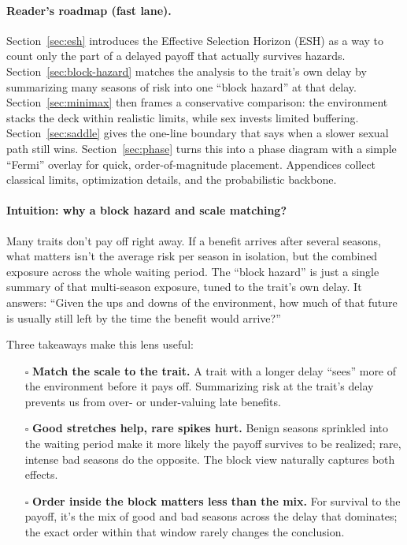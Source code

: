 \documentclass[11pt]{article}
\theoremstyle{upright}
\begin{document}
\paragraph{Reader’s roadmap (fast lane).}
Section~\ref{sec:esh} introduces the Effective Selection Horizon (ESH) as a way to count only the part of a delayed payoff that actually survives hazards. 
Section~\ref{sec:block-hazard} matches the analysis to the trait’s own delay by summarizing many seasons of risk into one “block hazard” at that delay. 
Section~\ref{sec:minimax} then frames a conservative comparison: the environment stacks the deck within realistic limits, while sex invests limited buffering. 
Section~\ref{sec:saddle} gives the one-line boundary that says when a slower sexual path still wins. 
Section~\ref{sec:phase} turns this into a phase diagram with a simple “Fermi” overlay for quick, order-of-magnitude placement. 
Appendices collect classical limits, optimization details, and the probabilistic backbone.

\paragraph{Intuition: why a block hazard and scale matching?}
Many traits don’t pay off right away. If a benefit arrives after several seasons, what matters isn’t the average risk per season in isolation, but the combined exposure across the whole waiting period. The “block hazard” is just a single summary of that multi-season exposure, tuned to the trait’s own delay. It answers: “Given the ups and downs of the environment, how much of that future is usually still left by the time the benefit would arrive?”

Three takeaways make this lens useful:
\begin{itemize}
\item[$\square$]  \textbf{Match the scale to the trait.} A trait with a longer delay “sees” more of the environment before it pays off. Summarizing risk at the trait’s delay prevents us from over- or under-valuing late benefits.
\item[$\square$]  \textbf{Good stretches help, rare spikes hurt.} Benign seasons sprinkled into the waiting period make it more likely the payoff survives to be realized; rare, intense bad seasons do the opposite. The block view naturally captures both effects.
\item[$\square$]  \textbf{Order inside the block matters less than the mix.} For survival to the payoff, it’s the mix of good and bad seasons across the delay that dominates; the exact order within that window rarely changes the conclusion.
\end{itemize}
\end{document}
